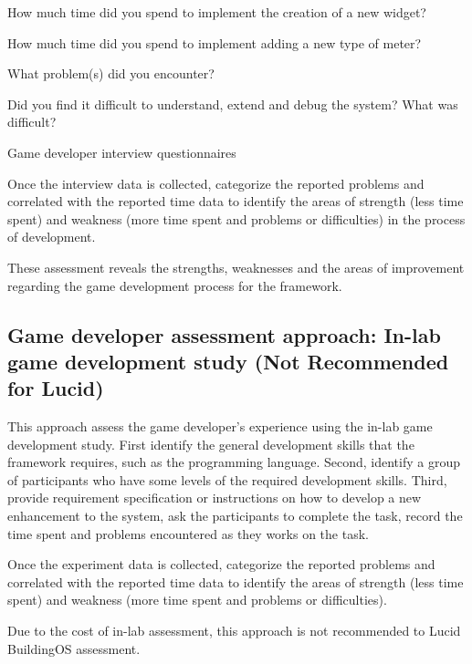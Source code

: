 \documentclass[11pt,oneside]{book}
\begin{document}
\begin{table}[ht!]
\begin{mybox}
\begin{compactenum}
\item How much time did you spend to implement the creation of a new widget?
\item How much time did you spend to implement adding a new type of meter?
\item What problem(s) did you encounter?
\item Did you find it difficult to understand, extend and debug the system? What was difficult?
\end{compactenum}
\end{mybox}
\caption{Game developer interview questionnaires}
\label{fig:game-developer-interview}  
\end{table}

Once the interview data is collected, categorize the reported problems and correlated with the reported time data to identify the areas of strength (less time spent) and weakness (more time spent and problems or difficulties) in the process of development. 

These assessment reveals the strengths, weaknesses and the areas of improvement regarding the game development process for the framework.

\subsection{Game developer assessment approach: In-lab game development study (Not Recommended for Lucid)}
\label{In-lab game development study}

This approach assess the game developer's experience using the in-lab game development study.  
First identify the general development skills that the framework requires, such as the programming language. 
Second, identify a group of participants who have some levels of the required development skills. Third, provide 
requirement specification or instructions on how to develop a new enhancement to the system, ask the 
participants to complete the task, record the time spent and problems encountered as they works on the task.

Once the experiment data is collected, categorize the reported problems and correlated with the reported time data 
to identify the areas of strength (less time spent) and weakness (more time spent and problems or difficulties). 

Due to the cost of in-lab assessment, this approach is not recommended to Lucid BuildingOS assessment.



\end{document}
